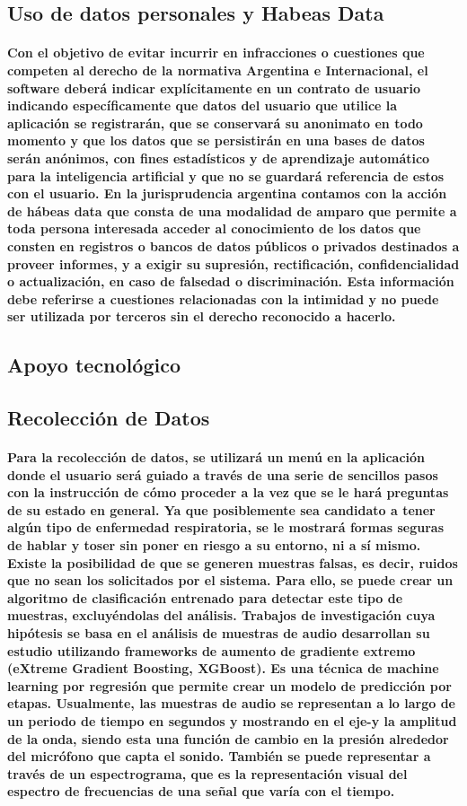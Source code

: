 \documentclass[12pt]{article}
\begin{document}
\subsection{Uso de datos personales y Habeas Data}
\paragraph{
Con el objetivo de evitar incurrir en infracciones o cuestiones que competen al derecho de la normativa Argentina e Internacional, el software deberá indicar explícitamente en un contrato de usuario indicando específicamente que datos del usuario que utilice la aplicación se registrarán, que se conservará su anonimato en todo momento y que los datos que se persistirán en una bases de datos serán anónimos, con fines estadísticos y de aprendizaje automático para la inteligencia artificial y que no se guardará referencia de estos con el usuario.
En la jurisprudencia argentina contamos con la acción de hábeas data que consta de una modalidad de amparo que permite a toda persona interesada acceder al conocimiento de los datos que consten en registros o bancos de datos públicos o privados destinados a proveer informes, y a exigir su supresión, rectificación, confidencialidad o actualización, en caso de falsedad o discriminación. Esta información debe referirse a cuestiones relacionadas con la intimidad y no puede ser utilizada por terceros sin el derecho reconocido a hacerlo.}
\subsection{Apoyo tecnológico}
\subsection{Recolección de Datos}
\paragraph{
Para la recolección de datos, se utilizará un menú en la aplicación donde el usuario será guiado a través de una serie de sencillos pasos con la instrucción de cómo proceder a la vez que se le hará preguntas de su estado en general. Ya que posiblemente sea candidato a tener algún tipo de enfermedad respiratoria, se le mostrará formas seguras de hablar y toser sin poner en riesgo a su entorno, ni a sí mismo.
Existe la posibilidad de que se generen muestras falsas, es decir, ruidos que no sean los solicitados por el sistema. Para ello, se puede crear un algoritmo de clasificación entrenado para detectar este tipo de muestras, excluyéndolas del análisis.
Trabajos de investigación cuya hipótesis se basa en el análisis de muestras de audio desarrollan su estudio utilizando frameworks de aumento de gradiente extremo (eXtreme Gradient Boosting, XGBoost). Es una técnica de machine learning por regresión que permite crear un modelo de predicción por etapas.
Usualmente, las muestras de audio se representan a lo largo de un periodo de tiempo en segundos y mostrando en el eje-y la amplitud de la onda, siendo esta una función de cambio en la presión alrededor del micrófono que capta el sonido.
También se puede representar a través de un espectrograma, que es la representación visual del espectro de frecuencias de una señal que varía con el tiempo.}
\end{document}
